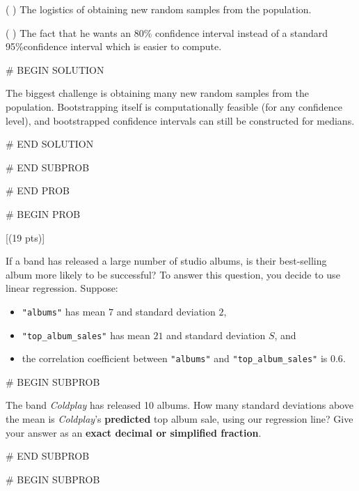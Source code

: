 \documentclass[twoside,12pt]{article}
\begin{document}
{\smallskip
( ) The logistics of obtaining new random samples from the population.

\smallskip
( ) The fact that he wants an 80\% confidence interval instead of a standard 95\%\gap confidence interval which is easier to compute.

# BEGIN SOLUTION


The biggest challenge is obtaining many new random samples from the population. Bootstrapping itself is computationally feasible (for any confidence level), and bootstrapped confidence intervals can still be constructed for medians.


# END SOLUTION



# END SUBPROB





# END PROB

\newpage

# BEGIN PROB

[(19 pts)]

If a band has released a large number of studio albums, is their best-selling album more likely to be successful? To answer this question, you decide to use linear regression. Suppose:
\begin{itemize}
    \item \texttt{"albums"} has mean $7$ and standard deviation $2$,
    \item \texttt{"top\_album\_sales"} has mean $21$ and standard deviation $S$, and
    \item the correlation coefficient between \texttt{"albums"} and \texttt{"top\_album\_sales"} is $0.6$.
\end{itemize}



# BEGIN SUBPROB

  
The band \textit{Coldplay} has released 10 albums. How many standard deviations above the mean is \textit{Coldplay}'s \textbf{predicted} top album sale, using our regression line? Give your answer as an \textbf{exact decimal or simplified fraction}.

\begin{center}
\end{center}



# END SUBPROB

\bigskip

# BEGIN SUBPROB

}
\end{document}
